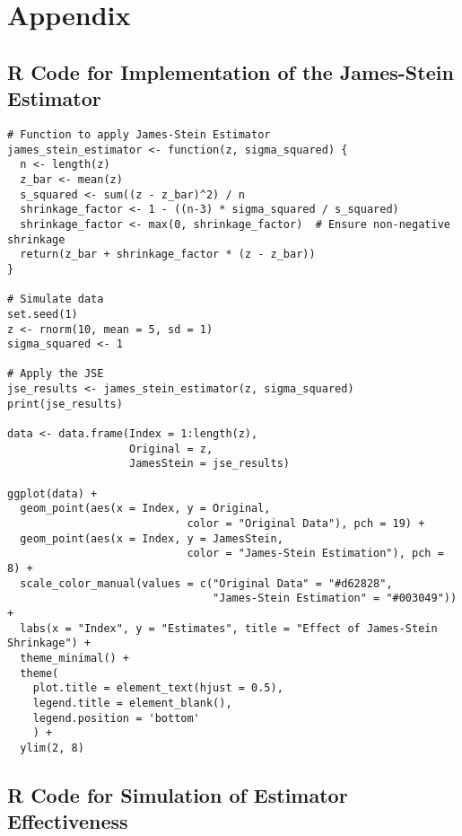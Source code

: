 \section{Appendix}

\subsection{R Code for Implementation of the James-Stein Estimator}

\begin{verbatim}
# Function to apply James-Stein Estimator
james_stein_estimator <- function(z, sigma_squared) {
  n <- length(z)
  z_bar <- mean(z)
  s_squared <- sum((z - z_bar)^2) / n
  shrinkage_factor <- 1 - ((n-3) * sigma_squared / s_squared)
  shrinkage_factor <- max(0, shrinkage_factor)  # Ensure non-negative shrinkage
  return(z_bar + shrinkage_factor * (z - z_bar))
}

# Simulate data
set.seed(1)
z <- rnorm(10, mean = 5, sd = 1)
sigma_squared <- 1

# Apply the JSE
jse_results <- james_stein_estimator(z, sigma_squared)
print(jse_results)

data <- data.frame(Index = 1:length(z),
                   Original = z,
                   JamesStein = jse_results)

ggplot(data) +
  geom_point(aes(x = Index, y = Original,
                            color = "Original Data"), pch = 19) +
  geom_point(aes(x = Index, y = JamesStein,
                            color = "James-Stein Estimation"), pch = 8) +
  scale_color_manual(values = c("Original Data" = "#d62828",
                                "James-Stein Estimation" = "#003049")) +
  labs(x = "Index", y = "Estimates", title = "Effect of James-Stein Shrinkage") +
  theme_minimal() +
  theme(
    plot.title = element_text(hjust = 0.5),
    legend.title = element_blank(),
    legend.position = 'bottom'
    ) +
  ylim(2, 8)
\end{verbatim}

\subsection{R Code for Simulation of Estimator Effectiveness}

